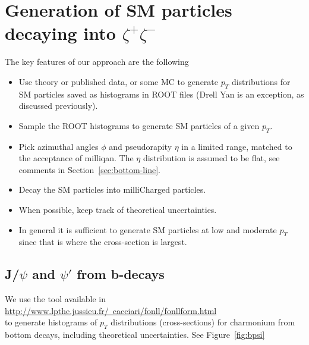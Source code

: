 \documentclass[12pt]{article}
\begin{document}
  \section{Generation of SM particles decaying into $\zeta^+ \zeta^-$}


  The key features of our approach are the following
\begin{itemize}
\item Use theory or published data, or some MC to generate $p_T$ distributions for SM
  particles
saved as histograms in ROOT files (Drell Yan is an exception, as discussed previously).
\item Sample the ROOT histograms to generate SM particles of a 
given $p_T$.
\item Pick azimuthal angles $\phi$ and pseudorapity $\eta$ in a
  limited 
  range, matched to the acceptance of milliqan.  The $\eta$
  distribution is assumed to be flat, see comments in
  Section~\ref{sec:bottom-line}.
\item Decay the SM particles into milliCharged particles. 
\item When possible, keep track of theoretical uncertainties.
\item In general it is sufficient to generate SM particles at low 
and moderate $p_T$ since that is where the cross-section is largest.
\end{itemize}

\subsection{J/$\psi$ and $\psi'$ from b-decays}
\label{sec:bpsi}
We use the tool available in \\
\href{http://www.lpthe.jussieu.fr/~cacciari/fonll/fonllform.html}
{http://www.lpthe.jussieu.fr/~cacciari/fonll/fonllform.html} \\
to
generate histograms of $p_T$ distributions (cross-sections) for charmonium from 
bottom decays, including theoretical 
uncertainties\cite{Cacciari:2012ny,Cacciari:2015fta}.  
See Figure~\ref{fig:bpsi} 
\end{document}

